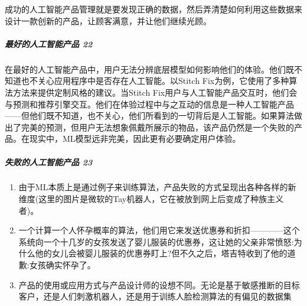 \documentclass[letterpaper,10pt,english]{sphinxmanual}
\begin{document}
成功的人工智能产品管理就是要发现正确的数据，然后弄清楚如何利用这些数据来设计一款创新的产品，让顾客满意，并让他们继续光顾。%
\begin{footnote}[309]\sphinxAtStartFootnote
{}
%
\end{footnote}


\subparagraph{最好的人工智能产品 22\sphinxfootnotemark[310]}
\label{\detokenize{chapter_introduction/AI_PM:id41}}%
\begin{footnotetext}[310]\sphinxAtStartFootnote
{}
%
\end{footnotetext}\ignorespaces 
在最好的人工智能产品中，用户无法分辨底层模型如何影响他们的体验。他们既不知道也不关心应用程序中是否存在人工智能。以Stitch
Fix为例，它使用了多种算法方法来提供定制风格的建议。当Stitch
Fix用户与人工智能产品交互时，他们会与预测和推荐引擎交互。他们在体验过程中与之互动的信息是一种人工智能产品——但他们既不知道，也不关心，他们所看到的一切背后是人工智能。如果算法做出了完美的预测，但用户无法想象佩戴所展示的物品，该产品仍然是一个失败的产品。在现实中，ML模型远非完美，因此更有必要确定用户体验。


\subparagraph{失败的人工智能产品 23\sphinxfootnotemark[311]}
\label{\detokenize{chapter_introduction/AI_PM:id42}}%
\begin{footnotetext}[311]\sphinxAtStartFootnote
{}
%
\end{footnotetext}\ignorespaces \begin{enumerate}
%
\item {} 
由于ML本质上是通过例子来训练算法，产品失败的方式呈现出各种各样的新维度(这里的图片是微软的Tay机器人，它在被放到网上后变成了种族主义者)。

\item {} 
一个计算一个人怀孕概率的算法，他们用它来发送优惠券和折扣————这个系统向一个十几岁的女孩发送了婴儿服装的优惠券，这让她的父亲非常愤怒:为什么他的女儿会被婴儿服装的优惠券盯上?但不久之后，塔吉特收到了他的道歉:女孩确实怀孕了。

\item {} 
产品的使用或应用方式与产品设计师的设想不同。无论是基于敏感推断的目标客户，还是人们刺激机器人，还是用于训练人脸检测算法的有偏见的数据集

\end{enumerate}
\end{document}
